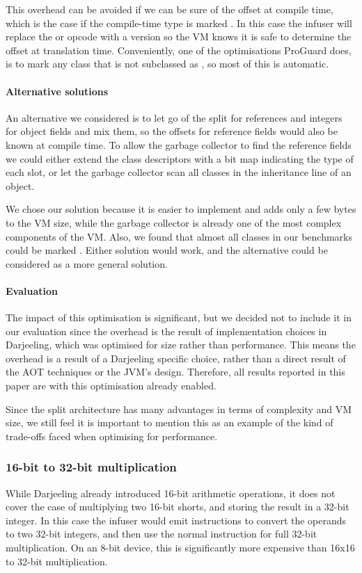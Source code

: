 This overhead can be avoided if we can be sure of the offset at compile time, which is the case if the compile-time type is marked . In this case the infuser will replace the  or  opcode with a  version so the VM knows it is safe to determine the offset at translation time. Conveniently, one of the optimisations ProGuard does, is to mark any class that is not subclassed as , so most of this is automatic.

\paragraph{Alternative solutions} An alternative we considered is to let go of the split for references and integers for object fields and mix them, so the offsets for reference fields would also be known at compile time. To allow the garbage collector to find the reference fields we could either extend the class descriptors with a bit map indicating the type of each slot, or let the garbage collector scan all classes in the inheritance line of an object.

We chose our solution because it is easier to implement and adds only a few bytes to the VM size, while the garbage collector is already one of the most complex components of the VM. Also, we found that almost all classes in our benchmarks could be marked . Either solution would work, and the alternative could be considered as a more general solution.

\paragraph{Evaluation}
The impact of this optimisation is significant, but we decided not to include it in our evaluation since the overhead is the result of implementation choices in Darjeeling, which was optimised for size rather than performance. This means the overhead is a result of a Darjeeling specific choice, rather than a direct result of the AOT techniques or the JVM's design. Therefore, all results reported in this paper are with this optimisation already enabled.

Since the split architecture has many advantages in terms of complexity and VM size, we still feel it is important to mention this as an example of the kind of trade-offs faced when optimising for performance.

\subsubsection{ 16-bit to 32-bit multiplication}
While Darjeeling already introduced 16-bit arithmetic operations, it does not cover the case of multiplying two 16-bit shorts, and storing the result in a 32-bit integer. In this case the infuser would emit  instructions to convert the operands to two 32-bit integers, and then use the normal  instruction for full 32-bit multiplication. On an 8-bit device, this is significantly more expensive than 16x16 to 32-bit multiplication.

